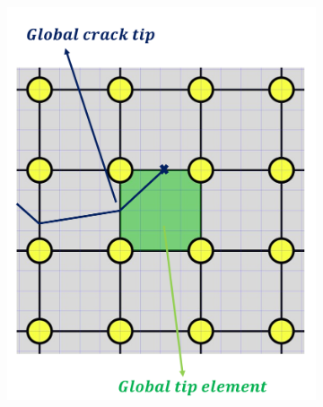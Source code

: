 \begin{figure}
\begin{subfigure}{.33\textwidth}
  \includegraphics[width=\linewidth]{img/Section2/schematic_2.png}
  \caption{}
  \label{fig:prop_2}
\end{subfigure}
\begin{subfigure}{.33\textwidth}
  \centering

\end{subfigure}
\end{figure}
